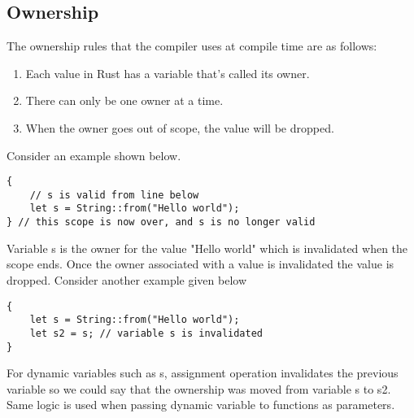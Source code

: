\documentclass[12pt, titlepage]{article}
\begin{document}
\subsection{Ownership}
The ownership rules that the compiler uses at compile time are as follows:
\begin{enumerate}
    \item{Each value in Rust has a variable that’s called its owner.}
    \item{There can only be one owner at a time.}
    \item{When the owner goes out of scope, the value will be dropped.}
\end{enumerate}

Consider an example shown below.
\begin{lstlisting}
{
    // s is valid from line below
    let s = String::from("Hello world");
} // this scope is now over, and s is no longer valid
\end{lstlisting}

Variable s is the owner for the value "Hello world" which is invalidated when the scope ends. Once the owner
associated with a value is invalidated the value is dropped. Consider another example
given below
\begin{lstlisting}
{
    let s = String::from("Hello world");
    let s2 = s; // variable s is invalidated
}
\end{lstlisting}
For dynamic variables such as s, assignment operation invalidates the previous
variable so we could say that the ownership was moved from variable s to s2. Same logic is used when
passing dynamic variable to functions as parameters.



\end{document}
